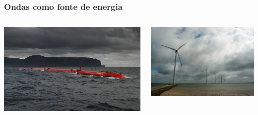 \begin{frame}
    \frametitle{Ondas como fonte de energia}
    \begin{columns}
        \begin{column}{0.5\textwidth}
            \begin{center}
                \includegraphics[width=\columnwidth]{./figures/800px-Pelamis_at_EMEC.jpg}
            \end{center}
        \end{column}
        \begin{column}{0.5\textwidth}
            \begin{center}
                \includegraphics[width=\columnwidth]{./figures/ronland_windpark.jpg}
            \end{center}
        \end{column}
    \end{columns}
\end{frame}

